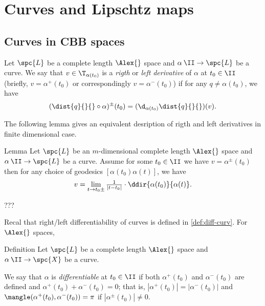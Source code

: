 \chapter{Curves and Lipschtz maps}


\section{Curves in CBB spaces}

Let
$\spc{L}$ be a complete length $\Alex{}$ space
and $\alpha\:\II\to \spc{L}$ be a curve.
We say that $v\in\T_{\alpha(t_0)}$ is a \emph{rigth} or \emph{left} \emph{derivative} of $\alpha$ at $t_0\in\II$ (briefly, $v=\alpha^+(t_0)$ or correspondingly $v=\alpha^-(t_0)$)
if 
for any $q\not=\alpha(t_0)$, we have
\[(\dist{q}{}{}\circ\alpha)^\pm(t_0)=(\d_{\alpha(t_0)}\dist{q}{}{})(v).\]



The following lemma gives an equivalent desription of rigth and left derivatives in finite dimensional case.


\begin{thm}{Lemma}
Let $\spc{L}$ be an $m$-dimensional complete length $\Alex{}$ space and $\alpha\:\II\to \spc{L}$ be a curve.
Assume for some $t_0\in \II$ we have $v=\alpha^\pm(t_0)$ then 
for any choice of geodesics $[\alpha(t_0)\alpha(t)]$, we have
\[v=\lim_{t\to t_0\pm}\tfrac{1}{|t-t_0|}\cdot\ddir{\alpha(t_0)}{\alpha(t)}.\]

\end{thm}

???
\qeds

Recal that right/left differentiability of curves is defined in \ref{def:diff-curv}.
For $\Alex{}$ spaces, 

\begin{thm}{Definition}\label{def:diff-curv-yet}
Let $\spc{L}$ be a complete length $\Alex{}$ space  
and $\alpha\:\II\to \spc{X}$ be a curve.

We say that $\alpha$ is \emph{differentiable} at $t_0\in\II$ if 
both $\alpha^+(t_0)$ and $\alpha^-(t_0)$ are defined and $\alpha^+(t_0)+\alpha^-(t_0)=0$; that is,  $|\alpha^+(t_0)|=|\alpha^-(t_0)|$ and 
$\mangle(\alpha^+(t_0),\alpha^-(t_0))=\pi$ if $|\alpha^\pm(t_0)|\ne 0$.
\end{thm}





